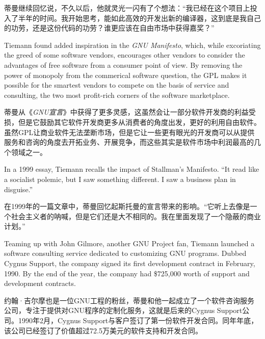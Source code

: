 \ifdefined\chs
蒂曼继续回忆说，不久以后，他就灵光一闪有了个想法：``我已经在这个项目上投入了半年的时间。我开始思考，能如此高效的开发出新的编译器，这到底是我自己的功劳，还是这份代码的功劳？谁更应该在自由市场中获得嘉奖？''
\fi

\ifdefined\eng
Tiemann found added inspiration in the \textit{GNU Manifesto}, which, while excoriating the greed of some software vendors, encourages other vendors to consider the advantages of free software from a consumer point of view. By removing the power of monopoly from the commerical software question, the GPL makes it possible for the smartest vendors to compete on the basis of service and consulting, the two most profit-rich corners of the software marketplace.
\fi

\ifdefined\chs
蒂曼从《\textit{GNU宣言}》中获得了更多灵感，这虽然会让一部分软件开发商的利益受损，但是它鼓励其它软件开发商更多从消费者的角度出发，更好的利用自由软件。虽然GPL让商业软件无法垄断市场，但是它让一些更有眼光的开发商可以从提供服务和咨询的角度去开拓业务、开展竞争，而这些其实是软件市场中利润最高的几个领域之一。
\fi

\ifdefined\eng
In a 1999 essay, Tiemann recalls the impact of Stallman's Manifesto. ``It read like a socialist polemic, but I saw something different. I saw a business plan in disguise.''
\fi

\ifdefined\chs
在1999年的一篇文章中，蒂曼回忆起斯托曼的宣言带来的影响。``它听上去像是一个社会主义者的呐喊，但是它们还是大不相同的。我在里面发现了一个隐蔽的商业计划。'' 
\fi

\ifdefined\eng
Teaming up with John Gilmore, another GNU Project fan, Tiemann launched a software consulting service dedicated to customizing GNU programs. Dubbed Cygnus Support, the company signed its first development contract in February, 1990. By the end of the year, the company had \$725,000 worth of support and development contracts.
\fi

\ifdefined\chs
约翰·吉尔摩也是一位GNU工程的粉丝，蒂曼和他一起成立了一个软件咨询服务公司，专注于提供对GNU程序的定制化服务，这就是后来的Cygnus Support公司。1990年2月，Cygnus Support与客户签订了第一份软件开发合同。同年年底，该公司已经签订了价值超过72.5万美元的软件支持和开发合同。
\fi

